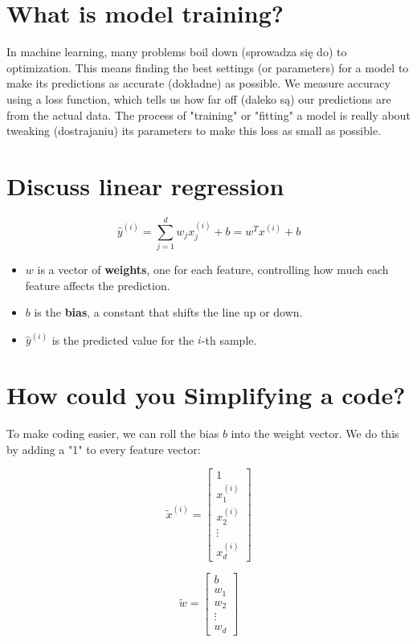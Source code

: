\documentclass{article}
\begin{document}
\section{What is model training?}

In machine learning, many problems boil down (sprowadza się do) to optimization. This means finding the best settings (or parameters) for a model to make its predictions as accurate (dokładne) as possible. We measure accuracy using a loss function, which tells us how far off (daleko są) our predictions are from the actual data. The process of "training" or "fitting" a model is really about tweaking (dostrajaniu) its parameters to make this loss as small as possible.
\section{Discuss linear regression}

\[
\hat{y}^{(i)} = \sum_{j=1}^{d} w_j x_j^{(i)} + b = w^{T} x^{(i)} + b
\]

\begin{itemize}
    \item \( w \) is a vector of \textbf{weights}, one for each feature, controlling how much each feature affects the prediction.
    \item \( b \) is the \textbf{bias}, a constant that shifts the line up or down.
    \item \( \hat{y}^{(i)} \) is the predicted value for the \( i \)-th sample.
\end{itemize}

\section{How could you Simplifying a code?}

To make coding easier, we can roll the bias \( b \) into the weight vector. We do this by adding a "1" to every feature vector:

\[
\tilde{x}^{(i)} =
\begin{bmatrix}
1 \\
x_1^{(i)} \\
x_2^{(i)} \\
\vdots \\
x_d^{(i)}
\end{bmatrix}
\]

\[
\tilde{w} =
\begin{bmatrix}
b \\
w_1 \\
w_2 \\
\vdots \\
w_d
\end{bmatrix}
\]
\end{document}
